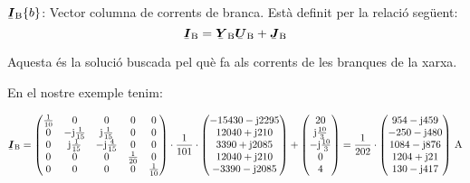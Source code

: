 \begin{list}{}
   \item[$\mcmplx{I}\ped{B}\{b\}$:]  Vector columna de corrents de branca. Est\`{a} definit per la relaci\'{o} seg\"{u}ent:
   \begin{equation}
      \mcmplx{I}\ped{B} = \mcmplx{Y}\ped{B} \mcmplx{U}\ped{B} + \mcmplx{J}\ped{B} \label{eq:ir}
   \end{equation}

   Aquesta \'{e}s la soluci\'{o} buscada pel qu\`{e} fa als corrents de les branques de la xarxa.

   En el nostre exemple tenim:
\end{list}
\[
   \mcmplx{I}\ped{B} =
   \begin{pmatrix}
         \frac{1}{10} & 0 & 0 & 0 & 0 \\
         0 & -\ju\frac{1}{15} & \ju\frac{1}{15} & 0 & 0 \\
         0 & \ju\frac{1}{15} & -\ju\frac{4}{15} & 0 & 0 \\
         0 & 0 & 0 & \frac{1}{20} & 0 \\
         0 & 0 & 0 & 0 & \frac{1}{10}
   \end{pmatrix} \cdot
   \frac{1}{101} \cdot \begin{pmatrix}
         -15430 - \ju 2295 \\
         12040 + \ju 210  \\
         3390 + \ju 2085 \\
         12040 + \ju 210  \\
         -3390 - \ju 2085
   \end{pmatrix}
   + \begin{pmatrix} 20 \\ \ju\frac{10}{3} \\ -\ju\frac{10}{3} \\ 0 \\ 4 \end{pmatrix} =
   \frac{1}{202} \cdot \begin{pmatrix}
         954 - \ju 459 \\
      -250 - \ju 480  \\
      1084 - \ju 876 \\
         1204 + \ju 21  \\
         130 - \ju 417
   \end{pmatrix}\unit{A}
\]

